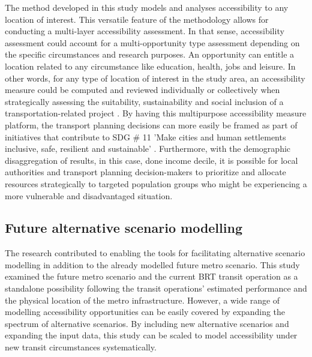 \documentclass[12pt, a4paper]{report}
\begin{document}
The method developed in this study models and analyses accessibility to any location of interest. This versatile feature of the methodology allows for conducting a multi-layer accessibility assessment. In that sense, accessibility assessment could account for a multi-opportunity type assessment depending on the specific circumstances and research purposes. An opportunity can entitle a location related to any circumstance like education, health, jobs and leisure. In other words, for any type of location of interest in the study area, an accessibility measure could be computed and reviewed individually or collectively when strategically assessing the suitability, sustainability and social inclusion of a transportation-related project \citep{pereiraIntroductionUrbanAccessibility2023a}. By having this multipurpose accessibility measure platform, the transport planning decisions can more easily be framed as part of initiatives that contribute to SDG \# 11 'Make cities and human settlements inclusive, safe, resilient and sustainable' \citep{unitednations17GOALSSustainable2015}. Furthermore, with the demographic disaggregation of results, in this case, done income decile, it is possible for local authorities and transport planning decision-makers to prioritize and allocate resources strategically to targeted population groups who might be experiencing a  more vulnerable and disadvantaged situation.




\subsection{Future alternative scenario modelling}

The research contributed to enabling the tools for facilitating alternative scenario modelling in addition to the already modelled future metro scenario. This study examined the future metro scenario and the current BRT transit operation as a standalone possibility following the transit operations' estimated performance and the physical location of the metro infrastructure. However, a wide range of modelling accessibility opportunities can be easily covered by expanding the spectrum of alternative scenarios. By including new alternative scenarios and expanding the input data, this study can be scaled to model accessibility under new transit circumstances systematically.
\end{document}

